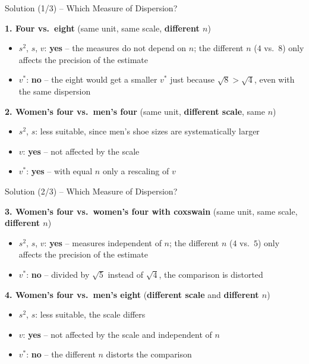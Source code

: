 \documentclass[aspectratio=169,11pt]{beamer}
\begin{document}
\begin{frame}{Solution (1/3) -- Which Measure of Dispersion?}

  \textbf{1. Four vs.\ eight} (same unit, same scale, \textbf{different $n$})
  \begin{itemize}
    \item $s^2$, $s$, $v$: \textbf{yes} -- the measures do not depend on $n$; the different $n$
      ($4$ vs.\ $8$) only affects the precision of the estimate
    \item $v^*$: \textbf{no} -- the eight would get a smaller $v^*$ just because $\sqrt{8} > \sqrt{4}$,
      even with the same dispersion
  \end{itemize}

  \vspace{0.2cm}

  \textbf{2. Women's four vs.\ men's four} (same unit, \textbf{different scale}, same $n$)
  \begin{itemize}
    \item $s^2$, $s$: less suitable, since men's shoe sizes are systematically larger
    \item $v$: \textbf{yes} -- not affected by the scale
    \item $v^*$: \textbf{yes} -- with equal $n$ only a rescaling of $v$
  \end{itemize}

\end{frame}

\begin{frame}{Solution (2/3) -- Which Measure of Dispersion?}

  \textbf{3. Women's four vs.\ women's four with coxswain} (same unit, same scale, \textbf{different $n$})
  \begin{itemize}
    \item $s^2$, $s$, $v$: \textbf{yes} -- measures independent of $n$; the different $n$
      ($4$ vs.\ $5$) only affects the precision of the estimate
    \item $v^*$: \textbf{no} -- divided by $\sqrt{5}$ instead of $\sqrt{4}$, the comparison is distorted
  \end{itemize}

  \vspace{0.2cm}

  \textbf{4. Women's four vs.\ men's eight} (\textbf{different scale} and \textbf{different $n$})
  \begin{itemize}
    \item $s^2$, $s$: less suitable, the scale differs
    \item $v$: \textbf{yes} -- not affected by the scale and independent of $n$
    \item $v^*$: \textbf{no} -- the different $n$ distorts the comparison
  \end{itemize}
\end{frame}
\end{document}
